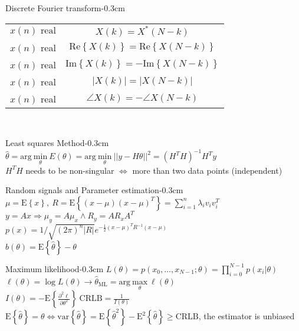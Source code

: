 \documentclass[10pt,3col]{cheatsheet}
\begin{document}
\begin{multicols*}{3}
\begin{cheatsheetbox}{Discrete Fourier transform}{-0.3cm}
\begin{tabular}{c c}
        $x(n) \text{ real}$ & $X(k) = X^\ast(N - k)$ \\
        $x(n)$ real & $\mathrm{Re}\left\{X(k)\right\} = \mathrm{Re}\left\{X(N - k)\right\}$ \\
        $x(n)$ real & $\mathrm{Im}\left\{X(k)\right\} = -\mathrm{Im}\left\{X(N - k)\right\}$ \\
        $x(n)$ real & $\left|X(k)\right| = \left|X(N - k)\right|$ \\
        $x(n)$ real & $\angle X(k) = - \angle X(N - k)$
	\end{tabular} \\
\end{cheatsheetbox}

\sectionbreak

\begin{cheatsheetbox}{Least squares Method}{-0.3cm}
	$\hat{\theta} = \mathrm{arg} \ \underset{\theta}{\mathrm{min}} \ E(\theta) = \mathrm{arg} \ \underset{\theta}{\mathrm{min}} \ ||y - H\theta||^2 = (H^TH)^{-1}H^Ty$\\
    $H^TH$ needs to be non-singular $\Leftrightarrow$ more than two data points (independent)
\end{cheatsheetbox}

\begin{cheatsheetbox}{Random signals and Parameter estimation}{-0.3cm}
	$\mu = \mathrm{E} \left\{x\right\}, \ R = \mathrm{E} \left\{(x - \mu)(x - \mu)^T\right\} = \sum_{i = 1}^n \lambda_iv_iv_i^T$\\
    $y = Ax \Rightarrow \mu_y = A\mu_x \wedge R_y = AR_xA^T$\\
    $p(x) = 1 / \sqrt{(2\pi)^n|R|} e^{-\frac{1}{2}(x-\mu)^TR^{-1}(x - \mu)}$\\
    $b(\theta) = \mathrm{E} \left\{\hat{\theta}\right\} - \theta$
\end{cheatsheetbox}

\begin{cheatsheetbox}{Maximum likelihood}{-0.3cm}
    $L(\theta) = p(x_0, \dots, x_{N-1}; \theta) = \prod_{i=0}^{N-1}p(x_i | \theta)$\\
	$\ell(\theta) = \log{L(\theta)} \rightarrow \hat{\theta}_\mathrm{ML} =  \mathrm{arg} \ \underset{\theta}{\mathrm{max}} \ \ell(\theta)$\\
    $I(\theta) = -\mathrm{E} \left\{\frac{\partial^2\ell}{\partial \theta^2}\right\} \ \mathrm{CRLB} = \frac{1}{I(\theta)}$\\
    $\mathrm{E} \left\{\hat{\theta}\right\} = \theta \Leftrightarrow\mathrm{var}\left\{\hat{\theta}\right\} = \mathrm{E} \left\{\hat{\theta}^2\right\} - \mathrm{E}^2\left\{\hat{\theta}\right\} \geq \mathrm{CRLB}$, the estimator is unbiased
\end{cheatsheetbox}


\end{multicols*}
\end{document}
